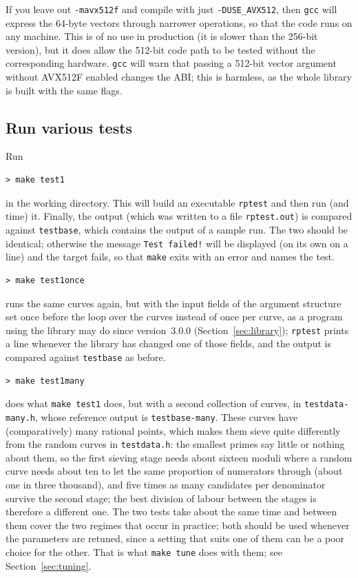 \documentclass[12pt,a4paper,oneside]{amsart}
\begin{document}
If you leave out \verb+-mavx512f+ and compile with just
\verb+-DUSE_AVX512+, then \texttt{gcc} will express the 64-byte vectors
through narrower operations, so that the code runs on any machine. This is
of no use in production (it is slower than the 256-bit version), but it
does allow the 512-bit code path to be tested without the corresponding
hardware. \texttt{gcc} will warn that passing a 512-bit vector argument
without AVX512F enabled changes the ABI; this is harmless, as the whole
library is built with the same flags.

\subsection{Run various tests}\label{sec:tests}

Run

\begin{verbatim}
> make test1
\end{verbatim}

in the working directory. This will build an executable \texttt{rptest} and
then run (and time) it. Finally, the output (which was written to a file
\texttt{rptest.out}) is compared against \texttt{testbase}, which contains the
output of a sample run. The two should be identical; otherwise the
message \texttt{Test failed!} will be displayed (on its own on a line) and
the target fails, so that \texttt{make} exits with an error and names the
test.

\begin{verbatim}
> make test1once
\end{verbatim}
runs the same curves again, but with the input fields of the argument
structure set once before the loop over the curves instead of once per
curve, as a program using the library may do since version~3.0.0
(Section~\ref{sec:library}); \texttt{rptest} prints a line whenever the
library has changed one of those fields, and the output is compared
against \texttt{testbase} as before.

\begin{verbatim}
> make test1many
\end{verbatim}
does what \texttt{make test1} does, but with a second collection of curves, in
\texttt{testdata-many.h}, whose reference output is \texttt{testbase-many}.
These curves have (comparatively) many rational points, which makes them
sieve quite differently from the random curves in \texttt{testdata.h}: the
smallest primes say little or nothing about them, so the first sieving stage
needs about sixteen moduli where a random curve needs about ten to let the
same proportion of numerators through (about one in three thousand), and
five times as many candidates per denominator survive the second stage; the
best division of labour between the stages is therefore a different one. The
two tests take about the same time and
between them cover the two regimes that occur in practice; both should be used
whenever the parameters are retuned, since a setting that suits one of them can
be a poor choice for the other. That is what \texttt{make tune} does with them;
see Section~\ref{sec:tuning}.
\end{document}
